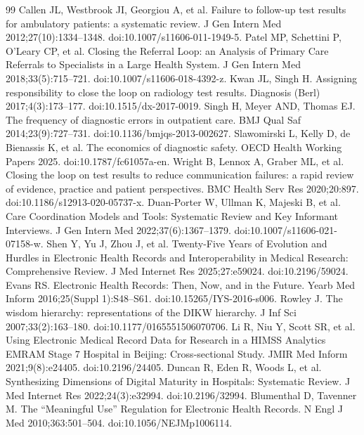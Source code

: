 \begin{thebibliography}{99}
\setlength{\itemsep}{2pt plus 0.5pt}\setlength{\parsep}{0pt}
\label{r1} Callen JL, Westbrook JI, Georgiou A, et al. Failure to follow-up test results for ambulatory patients: a systematic review. J Gen Intern Med 2012;27(10):1334--1348. doi:10.1007/s11606-011-1949-5.
\label{r2} Patel MP, Schettini P, O'Leary CP, et al. Closing the Referral Loop: an Analysis of Primary Care Referrals to Specialists in a Large Health System. J Gen Intern Med 2018;33(5):715--721. doi:10.1007/s11606-018-4392-z.
\label{r3} Kwan JL, Singh H. Assigning responsibility to close the loop on radiology test results. Diagnosis (Berl) 2017;4(3):173--177. doi:10.1515/dx-2017-0019.
\label{r4} Singh H, Meyer AND, Thomas EJ. The frequency of diagnostic errors in outpatient care. BMJ Qual Saf 2014;23(9):727--731. doi:10.1136/bmjqs-2013-002627.
\label{r5} Slawomirski L, Kelly D, de Bienassis K, et al. The economics of diagnostic safety. OECD Health Working Papers 2025. doi:10.1787/fc61057a-en.
\label{r6} Wright B, Lennox A, Graber ML, et al. Closing the loop on test results to reduce communication failures: a rapid review of evidence, practice and patient perspectives. BMC Health Serv Res 2020;20:897. doi:10.1186/s12913-020-05737-x.
\label{r7} Duan-Porter W, Ullman K, Majeski B, et al. Care Coordination Models and Tools: Systematic Review and Key Informant Interviews. J Gen Intern Med 2022;37(6):1367--1379. doi:10.1007/s11606-021-07158-w.
\label{r8} Shen Y, Yu J, Zhou J, et al. Twenty-Five Years of Evolution and Hurdles in Electronic Health Records and Interoperability in Medical Research: Comprehensive Review. J Med Internet Res 2025;27:e59024. doi:10.2196/59024.
\label{r9} Evans RS. Electronic Health Records: Then, Now, and in the Future. Yearb Med Inform 2016;25(Suppl 1):S48--S61. doi:10.15265/IYS-2016-s006.
\label{r10} Rowley J. The wisdom hierarchy: representations of the DIKW hierarchy. J Inf Sci 2007;33(2):163--180. doi:10.1177/0165551506070706.
\label{r11} Li R, Niu Y, Scott SR, et al. Using Electronic Medical Record Data for Research in a HIMSS Analytics EMRAM Stage 7 Hospital in Beijing: Cross-sectional Study. JMIR Med Inform 2021;9(8):e24405. doi:10.2196/24405.
\label{r12} Duncan R, Eden R, Woods L, et al. Synthesizing Dimensions of Digital Maturity in Hospitals: Systematic Review. J Med Internet Res 2022;24(3):e32994. doi:10.2196/32994.
\label{r13} Blumenthal D, Tavenner M. The ``Meaningful Use'' Regulation for Electronic Health Records. N Engl J Med 2010;363:501--504. doi:10.1056/NEJMp1006114.

\end{thebibliography}
